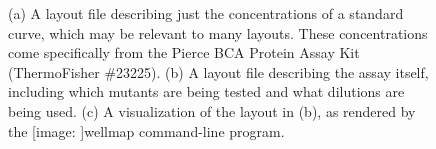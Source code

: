 \documentclass{bmcart}
\def\texttt{[image: ]}
\begin{document}
\begin{backmatter}
\begin{figure}[h!]
  \caption{\label{fig:bradford}%
     (a)
    A layout file describing just the concentrations of a standard curve, which
    may be relevant to many layouts. These concentrations come specifically
    from the Pierce BCA Protein Assay Kit (ThermoFisher \#23225). (b) A layout
    file describing the assay itself, including which mutants are being tested
    and what dilutions are being used.  (c) A visualization of the layout in
    (b), as rendered by the \texttt{wellmap} command-line program.}
\end{figure}



\end{backmatter}
\end{document}

